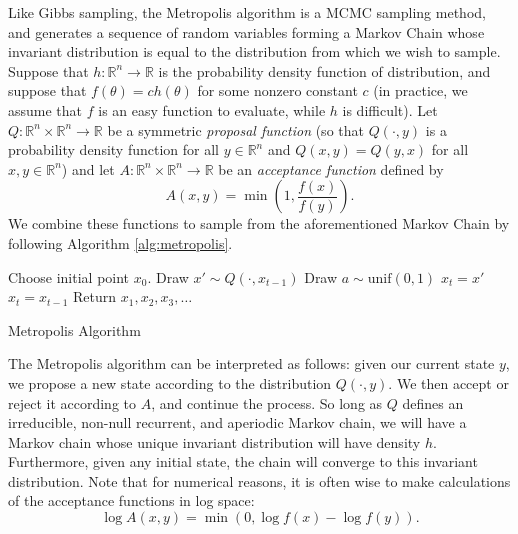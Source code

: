 Like Gibbs sampling, the Metropolis algorithm is a MCMC sampling method, and generates a sequence of random
variables forming a Markov Chain whose invariant distribution is equal to the distribution from which we wish
to sample. Suppose that $h : \mathbb{R}^n \rightarrow \mathbb{R}$ is the probability density function of distribution,
and suppose that $f(\theta) = ch(\theta)$ for some nonzero constant $c$ (in practice, we assume that $f$ is an easy
function to evaluate, while $h$ is difficult). Let $Q : \mathbb{R}^n \times \mathbb{R}^n \rightarrow \mathbb{R}$ be
a symmetric \emph{proposal function}
(so that $Q(\cdot, y)$ is a probability density function for all $y \in \mathbb{R}^n$
 and $Q(x,y) = Q(y,x)$ for all $x,y \in \mathbb{R}^n$) and let
 $A : \mathbb{R}^n \times \mathbb{R}^n \rightarrow \mathbb{R}$ be an \emph{acceptance function} defined by
\[
A(x,y) = \min\left(1, \frac{f(x)}{f(y)}\right).
\]
We combine these functions to sample from the aforementioned Markov Chain by following Algorithm \ref{alg:metropolis}.
\begin{algorithm}
\begin{algorithmic}[1]
    \State \textrm{Choose initial point } $x_0$.
        \State \textrm{Draw } $x' \sim Q(\cdot, x_{t-1})$
        \State \textrm{Draw } $a \sim \text{unif}(0,1)$
            \State $x_t = x'$
        \Else
            \State $x_t = x_{t-1}$
        \EndIf
    \EndFor
    \State \textrm{Return } $x_1,x_2,x_3,\ldots$
\EndProcedure
\end{algorithmic}
\caption{Metropolis Algorithm}
\label{alg:metropolis}
\end{algorithm}
The Metropolis algorithm can be interpreted as follows:
given our current state $y$, we propose a new state according to the distribution $Q(\cdot, y)$. We then accept or reject it according to $A$, and continue the process. So long as $Q$ defines an irreducible, non-null recurrent, and aperiodic Markov chain, we will have a Markov chain whose unique invariant distribution will have density $h$. Furthermore, given any initial state, the chain will converge to this invariant distribution.
Note that for numerical reasons, it is often wise to make calculations of the acceptance functions in log space:
\[
\log A(x,y) = \min(0, \log f(x) - \log f(y)).
\]

